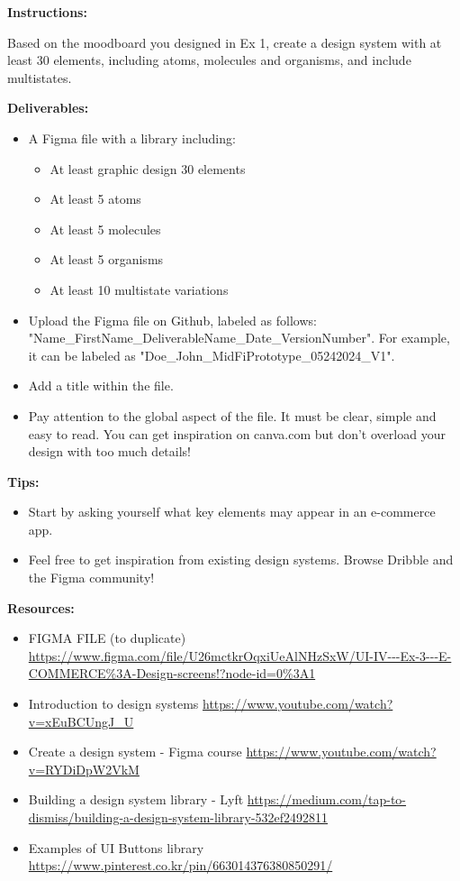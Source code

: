 \makeheaderfiles

\textbf{Instructions:}

Based on the moodboard you designed in Ex 1, create a design system with at least 30 elements, including atoms, molecules and organisms, and include multistates.

\textbf{Deliverables:}

\begin{itemize}
\item A Figma file with a library including:
\begin{itemize}
\item At least graphic design 30 elements
\item At least 5 atoms
\item At least 5 molecules
\item At least 5 organisms
\item At least 10 multistate variations
\end{itemize}
\item Upload the Figma file on Github, labeled as follows: "Name\_FirstName\_DeliverableName\_Date\_VersionNumber". For example, it can be labeled as "Doe\_John\_MidFiPrototype\_05242024\_V1".
\item Add a title within the file.
\item Pay attention to the global aspect of the file. It must be clear, simple and easy to read. You can get inspiration on canva.com but don't overload your design with too much details!
\end{itemize}

\textbf{Tips:}

\begin{itemize}
\item Start by asking yourself what key elements may appear in an e-commerce app.
\item Feel free to get inspiration from existing design systems. Browse Dribble and the Figma community!
\end{itemize}

\textbf{Resources:}

\begin{itemize}
\item FIGMA FILE (to duplicate) \url{https://www.figma.com/file/U26mctkrOqxiUeAlNHzSxW/UI-IV---Ex-3---E-COMMERCE%3A-Design-screens!?node-id=0%3A1}
\item Introduction to design systems \url{https://www.youtube.com/watch?v=xEuBCUngJ_U}
\item Create a design system - Figma course \url{https://www.youtube.com/watch?v=RYDiDpW2VkM}
\item Building a design system library - Lyft \url{https://medium.com/tap-to-dismiss/building-a-design-system-library-532ef2492811}
\item Examples of UI Buttons library \url{https://www.pinterest.co.kr/pin/663014376380850291/}
\end{itemize}


